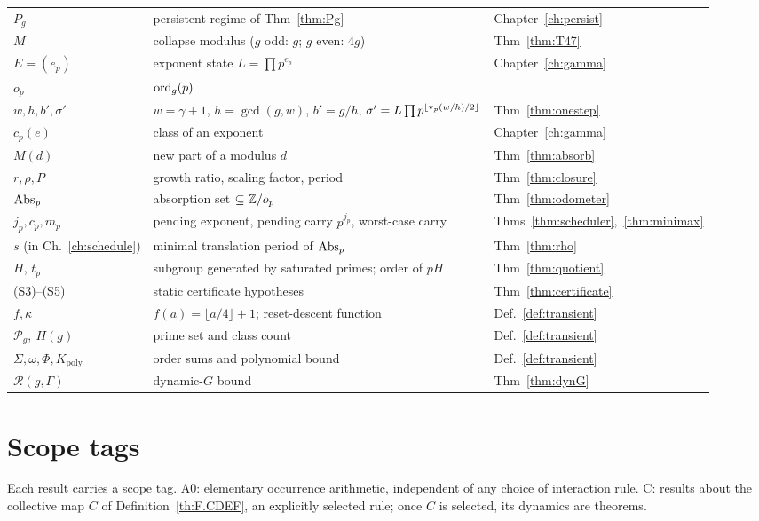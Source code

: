 \begin{longtable}{@{}p{26mm}p{70mm}p{30mm}@{}}
\(P_g\) & persistent regime of Thm~\ref{thm:Pg} & Chapter~\ref{ch:persist}\\
\(M\) & collapse modulus (\(g\) odd: \(g\); \(g\) even: \(4g\)) & Thm~\ref{thm:T47}\\
\(E=(e_p)\) & exponent state \(L=\prod p^{e_p}\) & Chapter~\ref{ch:gamma}\\
\(o_p\) & \(\operatorname{ord}_g(p)\) & \\
\(w,h,b',\sigma'\) & \(w=\gamma+1\), \(h=\gcd(g,w)\), \(b'=g/h\), \(\sigma'=L\prod p^{\lfloor\operatorname{v}_p(w/h)/2\rfloor}\) & Thm~\ref{thm:onestep}\\
\(c_p(e)\) & class of an exponent & Chapter~\ref{ch:gamma}\\
\(M(d)\) & new part of a modulus \(d\) & Thm~\ref{thm:absorb}\\
\(r,\rho,P\) & growth ratio, scaling factor, period & Thm~\ref{thm:closure}\\
\(\operatorname{Abs}_p\) & absorption set \(\subseteq\mathbb{Z}/o_p\) & Thm~\ref{thm:odometer}\\
\(j_p,c_p,m_p\) & pending exponent, pending carry \(p^{j_p}\), worst-case carry & Thms~\ref{thm:scheduler},~\ref{thm:minimax}\\
\(s\) (in Ch.~\ref{ch:schedule}) & minimal translation period of \(\operatorname{Abs}_p\) & Thm~\ref{thm:rho}\\
\(H\), \(t_p\) & subgroup generated by saturated primes; order of \(pH\) & Thm~\ref{thm:quotient}\\
(S3)--(S5) & static certificate hypotheses & Thm~\ref{thm:certificate}\\
\(f,\kappa\) & \(f(a)=\lfloor a/4\rfloor+1\); reset-descent function & Def.~\ref{def:transient}\\
\(\mathcal P_g,\ H(g)\) & prime set and class count & Def.~\ref{def:transient}\\
\(\Sigma,\omega,\Phi,K_{\mathrm{poly}}\) & order sums and polynomial bound & Def.~\ref{def:transient}\\
\(\mathcal R(g,\Gamma)\) & dynamic-\(G\) bound & Thm~\ref{thm:dynG}\\
\bottomrule
\end{longtable}
\normalsize

\section{Scope tags}

Each result carries a scope tag. \textsf{A0}: elementary occurrence arithmetic, independent of any choice of interaction rule. \textsf{C}: results about the collective map \(C\) of Definition~\ref{th:F.CDEF}, an explicitly selected rule; once \(C\) is selected, its dynamics are theorems.

